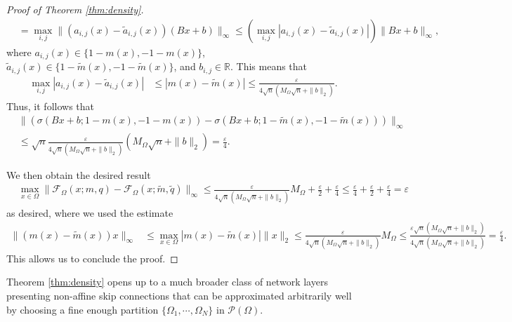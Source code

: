 \documentclass{article}
\theoremstyle{plain}
\theoremstyle{definition}
\theoremstyle{definition}
\theoremstyle{remark}
\theoremstyle{definition}
\theoremstyle{definition}
\theoremstyle{remark}
\numberwithin{equation}{section}
\begin{document}
\begin{proof}[Proof of Theorem \ref{thm:density}]
\[\begin{split}
&= \max_{i,j} \|(a_{i,j}(x)-\widetilde{a}_{i,j}(x))(Bx+b)\|_\infty\leq \left(\max_{i,j} |a_{i,j}(x)-\widetilde{a}_{i,j}(x)|\right )\|Bx+b\|_\infty ,
\end{split}
\]
where $a_{i,j}(x)\in\{1-m(x),-1-m(x)\}$, $\widetilde{a}_{i,j}(x)\in\{1-\widetilde{m}(x),-1-\widetilde{m}(x)\}$, and $b_{i,j}\in\mathbb{R}$. This means that
\[
\begin{aligned}
\max_{i,j}|a_{i,j}(x)-\widetilde{a}_{i,j}(x)| & \leq |m(x)-\widetilde{m}(x)|\leq \frac{\varepsilon}{4\sqrt{n}(M_{\Omega}\sqrt{n}+\|b\|_2)}.
\end{aligned}
\]
Thus, it follows that
\[
\begin{aligned}
&\|\left(\sigma(Bx+b;1-m(x),-1-m(x)) -\sigma(Bx+b;1-\widetilde{m}(x),-1-\widetilde{m}(x))\right)\|_\infty\\
&\leq \sqrt{n} \frac{\varepsilon}{4\sqrt{n}(M_\Omega\sqrt{n}+\|b\|_2)}(M_\Omega\sqrt{n}+\|b\|_2) = \frac{\varepsilon}{4}.
\end{aligned}
\]

We then obtain the desired result
\[
\begin{aligned}
&\max_{x\in\Omega}\|\mathcal{F}_{\Omega}(x;m,q)-\mathcal{F}_\Omega(x;\widetilde{m},\widetilde{q})\|_\infty\leq \frac{\varepsilon}{4\sqrt{n}(M_\Omega\sqrt{n} + \|b\|_2)}M_\Omega + \frac{\varepsilon}{2} + \frac{\varepsilon}{4}\leq \frac{\varepsilon}{4} + \frac{\varepsilon}{2} + \frac{\varepsilon}{4} = \varepsilon
\end{aligned}
\]
as desired, where we used the estimate
\[
\begin{split}
\|(m(x)-\widetilde{m}(x))x\|_\infty &\leq \max_{x\in\Omega}|m(x)-\widetilde{m}(x)| \|x\|_2\leq \frac{\varepsilon}{4\sqrt{n}(M_\Omega\sqrt{n} + \|b\|_2)}M_\Omega\leq \frac{\varepsilon \sqrt{n}(M_\Omega\sqrt{n}+\|b\|_2)}{4\sqrt{n}(M_\Omega\sqrt{n} + \|b\|_2)} = \frac{\varepsilon}{4}.
\end{split}
\]
This allows us to conclude the proof.
\end{proof}

Theorem \ref{thm:density} opens up to a much broader class of network layers presenting non-affine skip connections that can be approximated arbitrarily well by choosing a fine enough partition $\{\Omega_1, \cdots, \Omega_N\}$ in $\mathcal{P}(\Omega)$.
\end{document}
